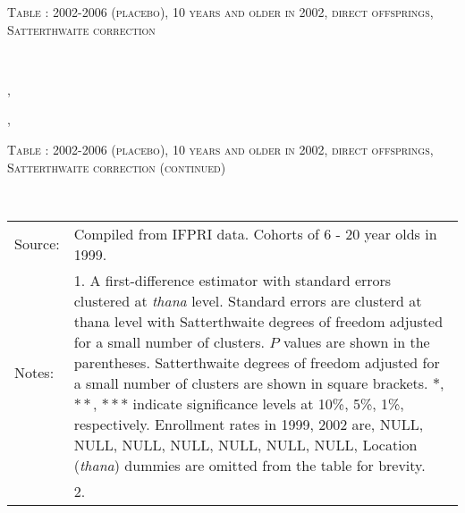 \begin{table}\hfil\textsc{\footnotesize Table \thetable:  2002-2006 (placebo), 10 years and older in 2002, direct offsprings, Satterthwaite correction\label{zEm.1999.10.sameN}}\\\setlength{\tabcolsep}{1pt}\renewcommand{\arraystretch}{.675}\hspace{-2em}\hfil{}\\\renewcommand{\arraystretch}{1}\end{table}, \addtocounter{table}{-1}, \begin{table}\hfil\textsc{\footnotesize Table \thetable:  2002-2006 (placebo), 10 years and older in 2002, direct offsprings, Satterthwaite correction (continued)\label{zEm.1999.10.sameN}}\\\setlength{\tabcolsep}{1pt}\renewcommand{\arraystretch}{.675}\hspace{-2em}\hfil{}\\\renewcommand{\arraystretch}{1}\hfil\begin{tabular}{>{\hfill\scriptsize}p{1cm}<{}>{\scriptsize}p{12cm}<{\hfill}} Source:& Compiled from IFPRI data. Cohorts of 6 - 20 year olds in 1999. \\[-1ex] Notes:& 1. A first-difference estimator with standard errors clustered at \textit{thana} level. Standard errors are clusterd at thana level with Satterthwaite degrees of freedom adjusted for a small number of clusters. $P$ values are shown in the parentheses. Satterthwaite degrees of freedom adjusted for a small number of clusters are shown in square brackets. $*$, $**$, $***$ indicate significance levels at 10\%, 5\%, 1\%, respectively. Enrollment rates in 1999, 2002 are, NULL, NULL, NULL, NULL, NULL, NULL, NULL, Location (\textit{thana}) dummies are omitted from the table for brevity. \\ & 2.   \end{tabular} \end{table}




